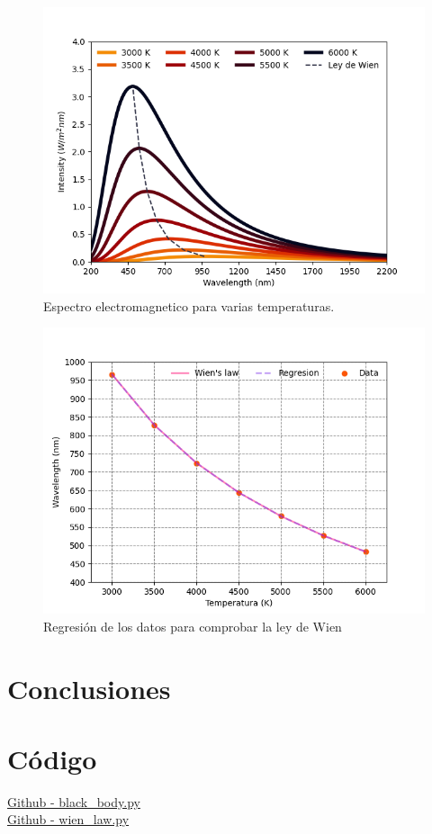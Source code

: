 \documentclass[12pt,letterpaper]{article}
\begin{document}
\begin{multicols}{2}
\begin{figure}[H]
\includegraphics[scale=0.45]{../Graphics/black_body.png}
\caption{Espectro electromagnetico para varias temperaturas.}
\end{figure}
\begin{figure}[H]
\includegraphics[scale=0.45]{../Graphics/wien_law.png}
\caption{Regresión de los datos para comprobar la ley de Wien}
\label{wienfig}
\end{figure}
\section*{Conclusiones}


\nocite{*}
\section*{Código}
\href{https://github.com/giovannilopez9808/Notas_Agosto_2020/blob/master/AMC/Reto1/black_body.py}{Github - black\_body.py}\\
\href{https://github.com/giovannilopez9808/Notas_Agosto_2020/blob/master/AMC/Reto1/wien_law.py}{Github - wien\_law.py}
\end{multicols}
\end{document}
